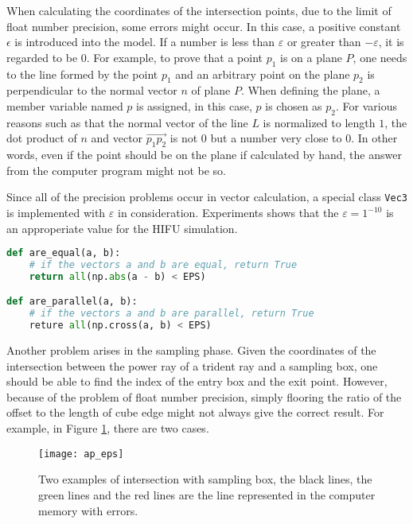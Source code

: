 When calculating the coordinates of the intersection points, due to the limit of float number precision, some errors might occur. In this case, a positive constant $\epsilon$ is introduced into the model. If a number is less than $\varepsilon$ or greater than $-\varepsilon$, it is regarded to be $0$. For example, to prove that a point $p_1$ is on a plane $P$, one needs to the line formed by the point $p_1$ and an arbitrary point on the plane $p_2$ is perpendicular to the normal vector $n$ of plane $P$. When defining the plane, a member variable named $p$ is assigned, in this case, $p$ is chosen as $p_2$. For various reasons such as that the normal vector of the line $L$ is normalized to length $1$, the dot product of $n$ and vector $\vec{p_1p_2}$ is not 0 but a number very close to 0. In other words, even if the point should be on the plane if calculated by hand, the answer from the computer program might not be so.

Since all of the precision problems occur in vector calculation, a special class \texttt{Vec3} is implemented with $\varepsilon$ in consideration. Experiments shows that the $\varepsilon=1^{-10}$ is an approperiate value for the HIFU simulation.

\begin{lstlisting}[language=Python]
def are_equal(a, b):
    # if the vectors a and b are equal, return True
    return all(np.abs(a - b) < EPS)

def are_parallel(a, b):
    # if the vectors a and b are parallel, return True
    reture all(np.cross(a, b) < EPS)
\end{lstlisting}

Another problem arises in the sampling phase. Given the coordinates of the intersection between the power ray of a trident ray and a sampling box, one should be able to find the index of the entry box and the exit point. However, because of the problem of float number precision, simply flooring the ratio of the offset to the length of cube edge might not always give the correct result. For example, in Figure \ref{fig:eps_handling}, there are two cases. 

\begin{figure}[h]
    \centering
    \texttt{[image: ap\_eps]}
    \caption{Two examples of intersection with sampling box, the black lines, the green lines and the red lines are the line represented in the computer memory with errors.}
    \label{fig:eps_handling}
\end{figure}

